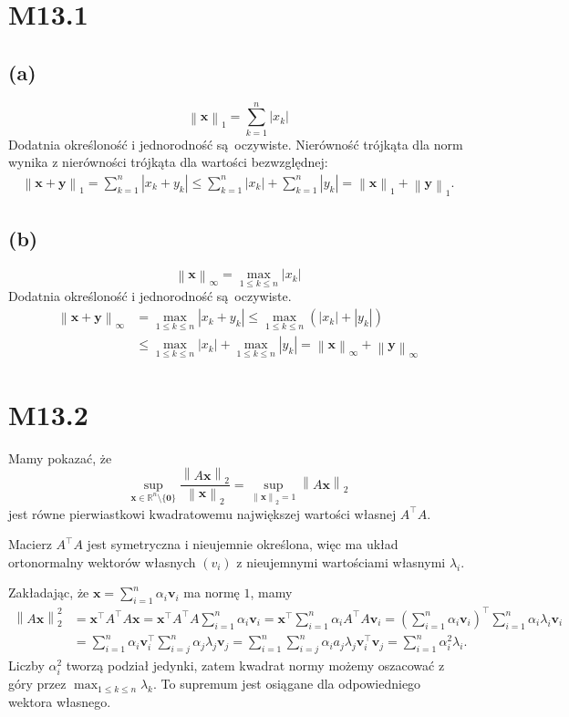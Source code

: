 \documentclass[a4paper, 12pt]{article}
\title{}
\author{Wiktor Kuchta}
\date{\vspace{-4ex}}
\newcommand{\norm}[1]{\left\lVert #1 \right\rVert}
\newcommand{\modulus}[1]{\left| #1 \right|}
\newcommand{\abs}{\modulus}
\newcommand{\+}{\enspace}
\begin{document}
\section*{M13.1}
\subsection*{(a)}
$$\norm{\mathbf{x}}_1 = ∑_{k=1}^n \abs{x_k}$$
Dodatnia określoność i jednorodność są oczywiste.
Nierówność trójkąta dla norm wynika z nierówności trójkąta dla wartości
bezwzględnej:
\begin{align*}
	\norm{\mathbf{x} + \mathbf{y}}_1
	= ∑_{k=1}^n \abs{x_k + y_k}
	≤ ∑_{k=1}^n \abs{x_k} + ∑_{k=1}^n \abs{y_k}
	= \norm{\mathbf{x}}_1 + \norm{\mathbf{y}}_1.
\end{align*}

\subsection*{(b)}
$$\norm{\mathbf{x}}_∞ = \max_{1 ≤ k ≤ n} \abs{x_k}$$
Dodatnia określoność i jednorodność są oczywiste.
\begin{align*}
	\norm{\mathbf{x} + \mathbf{y}}_∞
	&= \max_{1 ≤ k ≤ n} \abs{x_k + y_k}
	≤ \max_{1 ≤ k ≤ n} \left(\abs{x_k} + \abs{y_k}\right) \\
	&≤ \max_{1 ≤ k ≤ n} \abs{x_k} + \max_{1 ≤ k ≤ n} \abs{y_k}
	= \norm{\mathbf{x}}_∞ + \norm{\mathbf{y}}_∞
\end{align*}

\section*{M13.2}
Mamy pokazać, że
$$\sup_{\mathbf{x} ∈ ℝ^n \setminus \{\mathbf{0}\}}
\frac{\norm{A\mathbf{x}}_2}{\norm{\mathbf{x}}_2}
= \sup_{\norm{\mathbf{x}}_2 = 1} \norm{A\mathbf{x}}_2$$
jest równe pierwiastkowi kwadratowemu największej wartości własnej $A^\top A$.

Macierz $A^\top A$ jest symetryczna i nieujemnie określona,
więc ma układ ortonormalny wektorów własnych $(v_i)$ z nieujemnymi wartościami
własnymi $λ_i$.

Zakładając, że $\mathbf{x} = ∑_{i=1}^n α_i \mathbf{v}_i$ ma normę $1$, mamy
\begin{align*}
\norm{A\mathbf{x}}_2^2
&= \mathbf{x}^⊤ A^⊤ A \mathbf{x}
= \mathbf{x}^⊤ A^⊤ A ∑_{i=1}^n α_i \mathbf{v}_i
= \mathbf{x}^⊤ ∑_{i=1}^n α_i A^⊤ A \mathbf{v}_i
= \left(∑_{i=1}^n α_i \mathbf{v}_i\right)^⊤ ∑_{i=1}^n α_i λ_i \mathbf{v}_i \\
&= ∑_{i=1}^n α_i \mathbf{v}_i^⊤ ∑_{i=j}^n α_j λ_j \mathbf{v}_j
= ∑_{i=1}^n ∑_{i=j}^n α_i a_j λ_j \mathbf{v}_i^⊤ \mathbf{v}_j
= ∑_{i=1}^n α_i^2 λ_i.
\end{align*}
Liczby $α_i^2$ tworzą podział jedynki,
zatem kwadrat normy możemy oszacować z góry przez
$\max_{1 ≤ k ≤ n} λ_k.$
To supremum jest osiągane dla odpowiedniego wektora własnego.
\end{document}
